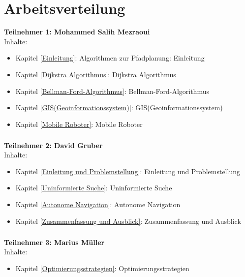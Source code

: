 \chapter*{Arbeitsverteilung}

\textbf{Teilnehmer 1: Mohammed Salih Mezraoui} 
\\
 Inhalte:
 \begin{itemize}
    \item Kapitel \ref{Einleitung}: Algorithmen zur Pfadplanung: Einleitung
    \item Kapitel \ref{Dijkstra Algorithmus}: Dijkstra Algorithmus
    \item Kapitel \ref{Bellman-Ford-Algorithmus}: Bellman-Ford-Algorithmus
    \item Kapitel \ref{GIS(Geoinformationssystem)}: GIS(Geoinformationssystem)
    \item Kapitel \ref{Mobile Roboter}: Mobile Roboter
\end{itemize}
\paragraph*{}
\textbf{Teilnehmer 2: David Gruber} 
\\
Inhalte: 
\begin{itemize}
    \item Kapitel \ref{Einleitung und Problemstellung}: Einleitung und Problemstellung
    \item Kapitel \ref{Uninformierte Suche}: Uninformierte Suche
    \item Kapitel \ref{Autonome Navigation}: Autonome Navigation
    \item Kapitel \ref{Zusammenfassung und Ausblick}: Zusammenfassung und Ausblick
\end{itemize}
\paragraph*{}
\textbf{Teilnehmer 3: Marius Müller} 
\\
 Inhalte: 
\begin{itemize}
	\item Kapitel \ref{Optimierungsstrategien}: Optimierungsstrategien
\end{itemize}
